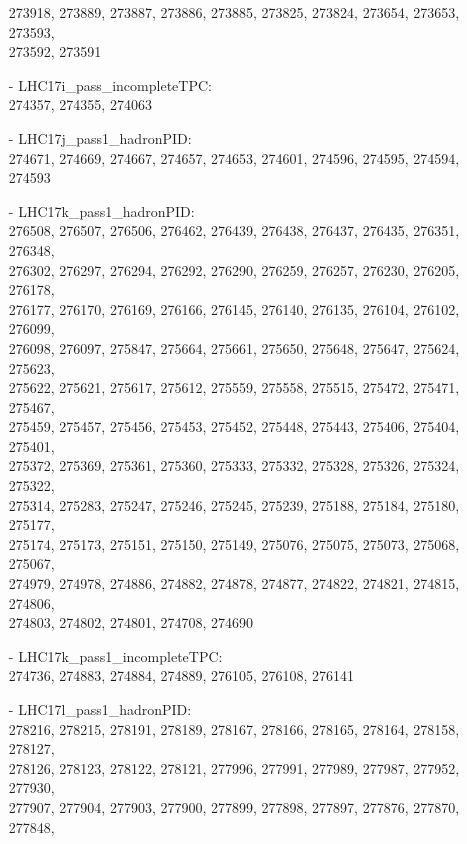 \begin{appendix}
\begin{itemize}
     273918, 273889, 273887, 273886, 273885, 273825, 273824, 273654, 273653, 273593,\\
     273592, 273591
    \item[-] LHC17i\_pass\_incompleteTPC:\\[1pt]
     274357, 274355, 274063 
    \item[-] LHC17j\_pass1\_hadronPID:\\[1pt]
     274671, 274669, 274667, 274657, 274653, 274601, 274596, 274595, 274594, 274593 
    \item[-] LHC17k\_pass1\_hadronPID:\\[1pt]
     276508, 276507, 276506, 276462, 276439, 276438, 276437, 276435, 276351, 276348,\\
     276302, 276297, 276294, 276292, 276290, 276259, 276257, 276230, 276205, 276178,\\
     276177, 276170, 276169, 276166, 276145, 276140, 276135, 276104, 276102, 276099,\\
     276098, 276097, 275847, 275664, 275661, 275650, 275648, 275647, 275624, 275623,\\
     275622, 275621, 275617, 275612, 275559, 275558, 275515, 275472, 275471, 275467,\\
     275459, 275457, 275456, 275453, 275452, 275448, 275443, 275406, 275404, 275401,\\
     275372, 275369, 275361, 275360, 275333, 275332, 275328, 275326, 275324, 275322,\\
     275314, 275283, 275247, 275246, 275245, 275239, 275188, 275184, 275180, 275177,\\
     275174, 275173, 275151, 275150, 275149, 275076, 275075, 275073, 275068, 275067,\\
     274979, 274978, 274886, 274882, 274878, 274877, 274822, 274821, 274815, 274806,\\
     274803, 274802, 274801, 274708, 274690
    \item[-] LHC17k\_pass1\_incompleteTPC:\\[1pt]
     274736, 274883, 274884, 274889, 276105, 276108, 276141
    \item[-] LHC17l\_pass1\_hadronPID:\\[1pt]
     278216, 278215, 278191, 278189, 278167, 278166, 278165, 278164, 278158, 278127,\\
     278126, 278123, 278122, 278121, 277996, 277991, 277989, 277987, 277952, 277930,\\
     277907, 277904, 277903, 277900, 277899, 277898, 277897, 277876, 277870, 277848,\\

\end{itemize}
\end{appendix}
